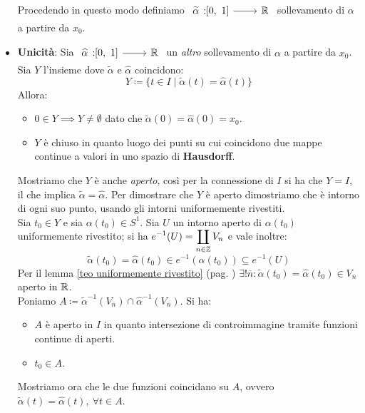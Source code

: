 \begin{demonstration}
\begin{itemize}
\begin{enumerate}
		\end{enumerate}
	Procedendo in questo modo definiamo $\funz {\widetilde{\alpha}} \intv \realset$ sollevamento di $\alpha$ a partire da $x_0$.
	\item \textbf{Unicità}: Sia $\funz {\widehat{\alpha}} \intv \realset$ un \textit{altro} sollevamento di $\alpha$ a partire da $x_0$. Sia $Y$ l'insieme dove $\widetilde{\alpha}$ e $\widehat{\alpha}$ coincidono:
	\begin{equation*}
		Y \coloneqq \{t\in I \mid \widetilde{\alpha}(t)=\widehat{\alpha}(t)\}
	\end{equation*}
	Allora:
	\begin{itemize}
		\item $0\in Y \implies Y\neq\emptyset$ dato che $\widetilde{\alpha}(0)=\widehat{\alpha}(0)=x_0$.
		\item $Y$ è chiuso in quanto luogo dei punti su cui coincidono due mappe continue a valori in uno spazio di \textbf{Hausdorff}.
	\end{itemize}
	Mostriamo che $Y$ è anche \textit{aperto}, così per la connessione di $I$ si ha che $Y=I$, il che implica $\widetilde{\alpha}=\widehat{\alpha}$. Per dimostrare che $Y$ è aperto dimostriamo che è intorno di ogni suo punto, usando gli intorni uniformemente rivestiti.\\
	Sia $t_0\in Y$ e sia $\alpha(t_0)\in S^1$. Sia $U$ un intorno aperto di $\alpha(t_0)$ uniformemente rivestito; si ha $\displaystyle e^{-1}(U)=\coprod_{n\in\mathbb{Z}}V_n$ e vale inoltre:
	\begin{equation*}
		\widetilde{\alpha}(t_0)=\widehat{\alpha}(t_0)\in e^{-1} \left( \alpha(t_0) \right)\subseteq e^{-1}(U)
	\end{equation*}
	Per il lemma \ref{teo uniformemente rivestito} (pag. \pageref{teo uniformemente rivestito}) $\exists ! \overline{n} \colon \widetilde{\alpha} (t_0)=\widehat{\alpha}(t_0)\in V_{\overline{n}}$ aperto in $\mathbb{R}$.\\
	Poniamo $A\coloneqq \widetilde{\alpha}^{-1}(V_{\overline{n}}) \cap \widehat{\alpha}^{-1}(V_{\overline{n}})$. Si ha:
	\begin{itemize}
		\item $A$ è aperto in $I$ in quanto intersezione di controimmagine tramite funzioni continue di aperti.
		\item $t_0 \in A$.
	\end{itemize}
	Mostriamo ora che le due funzioni coincidano su $A$, ovvero $\widetilde{\alpha}(t)=\widehat{\alpha}(t),\ \forall t\in A$.\\

\end{itemize}
\end{demonstration}
